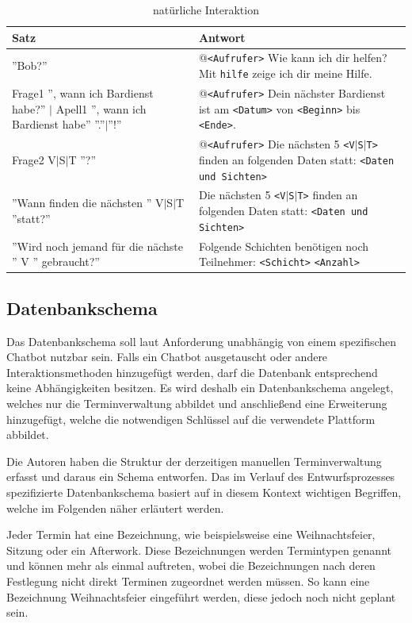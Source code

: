 \begin{table}[H]
\centering
\begin{tabularx}{\textwidth}{|p{5cm}|X|}
	\hline
	\textbf{Satz} & \textbf{Antwort} \\
	\hline
	''Bob?'' & @\texttt{<Aufrufer>} Wie kann ich dir helfen? Mit \texttt{hilfe} zeige ich dir meine Hilfe. \\
	\hline
	{Frage1 '', wann ich Bardienst habe?'' $|$ Apell1 '', wann ich Bardienst habe'' ''.''$|$''!''} & @\texttt{<Aufrufer>} Dein nächster Bardienst ist am \texttt{<Datum>} von \texttt{<Beginn>} bis \texttt{<Ende>}.\\
	\hline
	Frage2 V$|$S$|$T ''?'' & @\texttt{<Aufrufer>} Die nächsten 5 \texttt{<V$|$S$|$T>} finden an folgenden Daten statt: \texttt{<Daten und Sichten>}\\
	\hline
	''Wann finden die nächsten '' V$|$S$|$T ''statt?'' & Die nächsten 5 \texttt{<V$|$S$|$T>} finden an folgenden Daten statt: \texttt{<Daten und Sichten>}\\
	\hline
	''Wird noch jemand für die nächste '' V '' gebraucht?'' &  Folgende Schichten benötigen noch Teilnehmer: \texttt{<Schicht>} \texttt{<Anzahl>} \\
	\hline
\end{tabularx}
\caption{natürliche Interaktion}
\label{tab:natuerlicheinteraktion}
\end{table}




\subsection{Datenbankschema}

Das Datenbankschema soll laut Anforderung unabhängig von einem spezifischen Chatbot nutzbar sein. Falls ein Chatbot ausgetauscht oder andere Interaktionsmethoden hinzugefügt werden, darf die Datenbank entsprechend keine Abhängigkeiten besitzen. Es wird deshalb ein Datenbankschema angelegt, welches nur die Terminverwaltung abbildet und anschließend eine Erweiterung hinzugefügt, welche die notwendigen Schlüssel auf die verwendete Plattform abbildet.

Die Autoren haben die Struktur der derzeitigen manuellen Terminverwaltung erfasst und daraus ein Schema entworfen. 
Das im Verlauf des Entwurfsprozesses spezifizierte Datenbankschema basiert auf in diesem Kontext wichtigen Begriffen, welche im Folgenden näher erläutert werden.

Jeder Termin hat eine Bezeichnung, wie beispielsweise eine Weihnachtsfeier, Sitzung oder ein Afterwork. Diese Bezeichnungen werden Termintypen genannt und können mehr als einmal auftreten, wobei die Bezeichnungen nach deren Festlegung nicht direkt Terminen zugeordnet werden müssen. So kann eine Bezeichnung Weihnachtsfeier eingeführt werden, diese jedoch noch nicht geplant sein.

